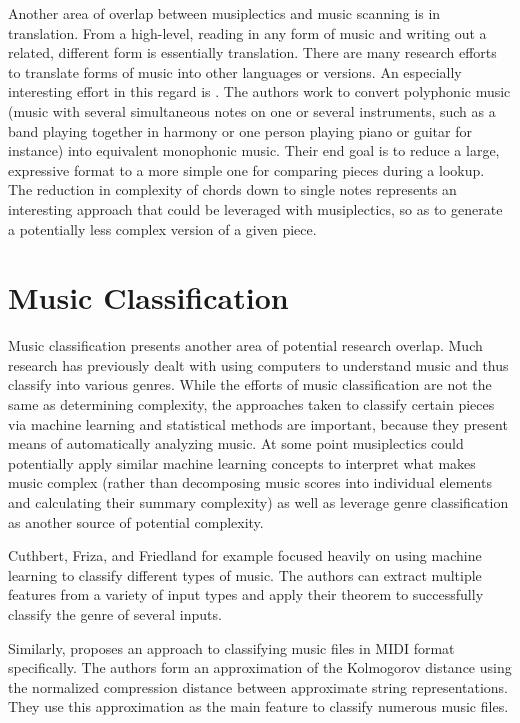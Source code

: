 \documentclass[12pt]{report}
\begin{document}
Another area of overlap between musiplectics and music scanning is in translation. From a high-level, reading in any form of music and writing out a related, different form is essentially translation. There are many research efforts to translate forms of music into other languages or versions. An especially interesting effort in this regard is \cite{Allali2009}. The authors work to convert polyphonic music (music with several simultaneous notes on one or several instruments, such as a band playing together in harmony or one person playing piano or guitar for instance) into equivalent monophonic music. Their end goal is to reduce a large, expressive format to a more simple one for comparing pieces during a lookup. The reduction in complexity of chords down to single notes represents an interesting approach that could be leveraged with musiplectics, so as to generate a potentially less complex version of a given piece.

\section{Music Classification}
\label{sec:relclass}

Music classification presents another area of potential research overlap. Much research has previously dealt with using computers to understand music and thus classify into various genres. While the efforts of music classification are not the same as determining complexity, the approaches taken to classify certain pieces via machine learning and statistical methods are important, because they present means of automatically analyzing music. At some point musiplectics could potentially apply similar machine learning concepts to interpret what makes music complex (rather than decomposing music scores into individual elements and calculating their summary complexity) as well as leverage genre classification as another source of potential complexity.

Cuthbert, Friza, and Friedland \cite{Cuthbert2011} for example focused heavily on using machine learning to classify different types of music. The authors can extract multiple features from a variety of input types and apply their theorem to successfully classify the genre of several inputs.

Similarly, \cite{Cataltepe2007} proposes an approach to classifying music files in MIDI format specifically. The authors form an approximation of the Kolmogorov distance using the normalized compression distance between approximate string representations. They use this approximation as the main feature to classify numerous music files.
\end{document}
